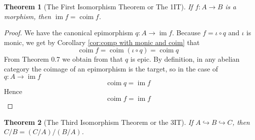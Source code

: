 \documentclass{article}
\DeclareMathOperator{\im}{im}
\DeclareMathOperator{\coim}{coim}
\newtheorem{theorem}{Theorem}[section]
\begin{document}
\begin{theorem}[The First Isomorphism Theorem or The 1IT]\label{thm:1IT}
    If $f:A\to B$ is a morphism, then $\im f= \coim f$.
\end{theorem}
\begin{proof}
    We have the canonical epimorphism $q:A\to \im f$. Because $f=\iota \circ q$ and $\iota$ is monic, we get by Corollary \ref{cor:comp with monic and coim} that
    \[
    \coim f=\coim (\iota \circ q)=\coim q
    \]
    From Theorem 0.7 we obtain from that $q$ is epic. By definition, in any abelian category the coimage of an epimorphism is the target, so in the case of $q:A\to \im f$
    \[
    \coim q=\im f
    \]
    Hence
    \[
    \coim f=\im f
    \]
\end{proof}
\begin{theorem}[The Third Isomorphism Theorem or the 3IT]\label{thm:3IT}
    If $A\hookrightarrow B\hookrightarrow C$, then $C/B=(C/A)/(B/A)$.
\end{theorem}
\end{document}
